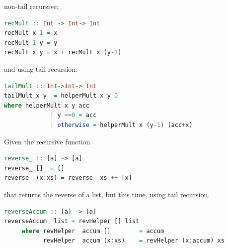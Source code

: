 \documentclass{article}
\begin{document}
\begin{solution}
non-tail recursive:
\begin{lstlisting}[language=Haskell]
recMult :: Int -> Int-> Int
recMult x 1 = x
recMult 1 y = y
recMult x y = x + recMult x (y-1)
\end{lstlisting}
and using tail recursion: 
\begin{lstlisting}[language=Haskell]
tailMult :: Int->Int-> Int
tailMult x y  = helperMult x y 0
where helperMult x y acc     
             | y ==0 = acc 
             | otherwise = helperMult x (y-1) (acc+x)
\end{lstlisting}
\end{solution}
\begin{exercise}
	
Given the  recursive function 
\begin{lstlisting}[language=Haskell]
reverse_ :: [a] -> [a]
reverse_ []  = []
reverse_ (x:xs) = reverse_ xs ++ [x]	
\end{lstlisting}
that returns the reverse of a list, but this time, using tail recursion.
\end{exercise}

\begin{solution}
\begin{lstlisting}[language=Haskell]
reverseAccum :: [a] -> [a]
reverseAccum  list = revHelper [] list
     where revHelper  accum []        = accum
           revHelper  accum (x:xs)    = revHelper (x:accum) xs
\end{lstlisting}
\end{solution}

\end{document}
